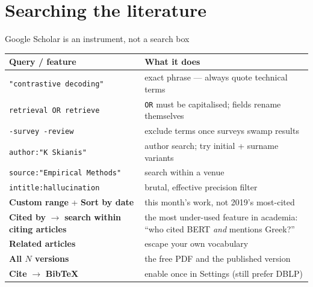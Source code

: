 \documentclass[aspectratio=169,11pt]{beamer}
\newcommand{\code}[1]{\texttt{\small #1}}
\begin{document}
\section{Searching the literature}

\begin{frame}{Google Scholar is an instrument, not a search box}
\footnotesize
\begin{tabularx}{\textwidth}{>{\raggedright\arraybackslash}p{4.6cm} X}
\toprule
\textbf{\color{brand}Query / feature} & \textbf{\color{brand}What it does} \\
\midrule
\rowcolor{rowtint} \code{"contrastive decoding"} & exact phrase --- always quote technical terms \\
\code{retrieval OR retrieve} & \code{OR} must be capitalised; fields rename themselves \\
\rowcolor{rowtint} \code{-survey -review} & exclude terms once surveys swamp results \\
\code{author:"K Skianis"} & author search; try initial + surname variants \\
\rowcolor{rowtint} \code{source:"Empirical Methods"} & search within a venue \\
\code{intitle:hallucination} & brutal, effective precision filter \\
\rowcolor{rowtint} \textbf{Custom range} + \textbf{Sort by date} & this month's work, not 2019's most-cited \\
\textbf{Cited by} $\rightarrow$ \textbf{search within citing articles} & the most under-used feature in academia: ``who cited BERT \emph{and} mentions Greek?'' \\
\rowcolor{rowtint} \textbf{Related articles} & escape your own vocabulary \\
\textbf{All $N$ versions} & the free PDF and the published version \\
\rowcolor{rowtint} \textbf{Cite} $\rightarrow$ \textbf{BibTeX} & enable once in Settings (still prefer DBLP) \\
\bottomrule
\end{tabularx}
\end{frame}
\end{document}
